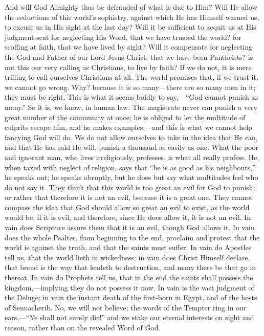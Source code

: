 And will God Almighty thus be defrauded of what is due to Him? Will
He allow the seductions of this world's sophistry, against which He
has Himself warned us, to excuse us in His sight at the last day? Will
it be sufficient to acquit us at His judgment-seat for neglecting His
Word, that we have trusted the world? for scoffing at faith, that we
have lived by sight? Will it compensate for neglecting the God and
Father of our Lord Jesus Christ, that we have been Pantheists? is not
this our very calling as Christians, to live by faith? If we do not,
it is mere trifling to call ourselves Christians at all. The world
promises that, if we trust it, we cannot go wrong. Why? because it is
so many—there are so many men in it; they must be right. This is
what it seems boldly to say,—``God cannot punish so many.''
So it is, we know, in human law. The magistrate never can punish a
very great number of the community at once; he is obliged to let the
multitude of culprits escape him, and he makes examples;—and this is
what we cannot help fancying God will do. We do not allow ourselves to
take in the idea that He can, and that He has said He will, punish a
thousand as easily as one. What the poor and ignorant man, who lives
irreligiously, professes, is what all really profess. He, when taxed
with neglect of religion, says that ``he is as good as his
neighbours,'' he speaks out; he speaks abruptly, but he does but
say what multitudes feel who do not say it. They think that this world
is too great an evil for God to punish; or rather that therefore it is
not an evil, because it is a great one. They cannot compass the idea
that God should allow so great an evil to exist, as the world would
be, if it is evil; and therefore, since He does allow it, it is not an
evil. In vain does Scripture assure them that it is an evil, though
God allows it. In vain does the whole Psalter, from beginning to the
end, proclaim and protest that the world is against the truth, and
that the saints must suffer. In vain do Apostles tell us, that the
world lieth in wickedness; in vain does Christ Himself declare, that
broad is the way that leadeth to destruction, and many there be that
go in thereat. In vain do Prophets tell us, that in the end the saints
shall possess the kingdom,—implying they do not possess it now. In
vain is the vast judgment of the Deluge; in vain the instant death of
the first-born in Egypt, and of the hosts of Sennacherib. No, we will
not believe; the words of the Tempter ring in our ears,—``Ye
shall not surely die!'' and we stake our eternal interests on
sight and reason, rather than on the revealed Word of God.

